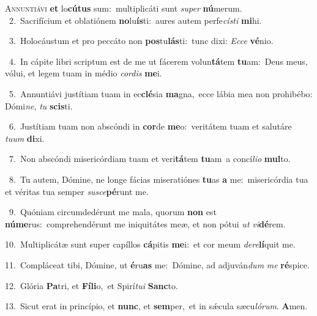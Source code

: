 \lettrine{\initial\textcolor{\initialcolor}{A}}{nnuntiávi} \textbf{et} lo\-\textbf{cú}\-\textbf{tus} sum:~\star multiplicáti sunt \textit{su}\-\textit{per} \textbf{nú}\-merum.\\
{\numbfont\textcolor{\numbcolor}{~2.}}~Sacrifícium et oblatiónem \textbf{no}\-lu\-\textbf{ís}\-ti:~\star aures autem perfe\-\textit{cís}\-\textit{ti} \textbf{mi}\-hi.\par
{\numbfont\textcolor{\numbcolor}{~3.}}~Holocáustum et pro peccáto non \textbf{pos}\-tu\-\textbf{lás}\-ti:~\star tunc dixi: \textit{Ec}\-\textit{ce} \textbf{vé}\-nio.\par
{\numbfont\textcolor{\numbcolor}{~4.}}~In cápite libri scriptum est de me ut fácerem volun\-\textbf{tá}\-tem \textbf{tu}\-am:~\star Deus meus, vólui, et legem tuam in médio \textit{cor}\-\textit{dis} \textbf{me}\-i.\par
{\numbfont\textcolor{\numbcolor}{~5.}}~Annuntiávi justítiam tuam in ec\-\textbf{clé}\-sia \textbf{ma}\-gna,~\star ecce lábia mea non prohibébo: Dómi\-\textit{ne}\-, \textit{tu} \textbf{scis}\-ti.\par
{\numbfont\textcolor{\numbcolor}{~6.}}~Justítiam tuam non abscóndi in \textbf{cor}\-de \textbf{me}\-o:~\star veritátem tuam et salutáre \textit{tu}\-\textit{um} \textbf{di}\-xi.\par
{\numbfont\textcolor{\numbcolor}{~7.}}~Non abscóndi misericórdiam tuam et veri\-\textbf{tá}\-tem \textbf{tu}\-am~\star a concí\-\textit{li}\-\textit{o} \textbf{mul}\-to.\par
{\numbfont\textcolor{\numbcolor}{~8.}}~Tu autem, Dómine, ne longe fácias miseratiónes \textbf{tu}\-as \textbf{a} me:~\star misericórdia tua et véritas tua semper \textit{su}\-\textit{sce}\textbf{pé}runt me.\par
{\numbfont\textcolor{\numbcolor}{~9.}}~Quóniam circumdedérunt me mala, quorum \textbf{non} est \textbf{nú}\-\textbf{me}rus:~\star comprehendérunt me iniquitátes meæ, et non pótui \textit{ut} \textit{vi}\-\textbf{dé}rem.\par
{\numbfont\textcolor{\numbcolor}{10.}}~Multiplicátæ sunt super capíllos \textbf{cá}\-pitis \textbf{me}\-i:~\star et cor meum \textit{de}\-\textit{re}\textbf{lí}quit me.\par
{\numbfont\textcolor{\numbcolor}{11.}}~Compláceat tibi, Dómine, ut \textbf{é}\-ru\textbf{as} me:~\star Dómine, ad adjuván\textit{dum} \textit{me} \textbf{ré}\-spice.\par
{\numbfont\textcolor{\numbcolor}{12.}}~Glória \textbf{Pa}\-tri, et \textbf{Fí}\-\textbf{li}o,~\star et Spirí\-\textit{tu}\-\textit{i} \textbf{Sanc}\-to.\par
{\numbfont\textcolor{\numbcolor}{13.}}~Sicut erat in princípio, et \textbf{nunc}\-, et \textbf{sem}\-per,~\star et in sǽcula sæcu\-\textit{ló}\-\textit{rum}. \textbf{A}\-men.\par

